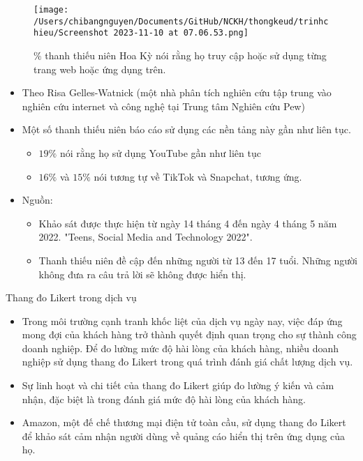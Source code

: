 \documentclass{beamer}
\begin{document}
\begin{frame}
\begin{figure}
    \centering
    \texttt{[image: /Users/chibangnguyen/Documents/GitHub/NCKH/thongkeud/trinhchieu/Screenshot 2023-11-10 at 07.06.53.png]}
    \caption{\centering $\%$ thanh thiếu niên Hoa Kỳ nói rằng họ truy cập hoặc sử dụng từng trang web hoặc ứng dụng trên.}
\end{figure}    
\end{frame}

\begin{frame}
    \begin{itemize}
    \item Theo Risa Gelles-Watnick (một nhà phân tích nghiên cứu tập trung vào nghiên cứu internet và công nghệ tại Trung tâm Nghiên cứu Pew)
    \item Một số thanh thiếu niên báo cáo sử dụng các nền tảng này gần như liên tục.
    \begin{itemize}
    \item $19\%$ nói rằng họ sử dụng YouTube gần như liên tục
    \item $16\%$ và $15\%$ nói tương tự về TikTok và Snapchat, tương ứng.
    \end{itemize}
    \end{itemize}
    \begin{itemize}
        \item Nguồn:
        \begin{itemize}
        \item Khảo sát được thực hiện từ ngày 14 tháng 4 đến ngày 4 tháng 5 năm 2022.
        "Teens, Social Media and Technology 2022".
        \item Thanh thiếu niên đề cập đến những người từ 13 đến 17 tuổi. Những người không đưa ra câu trả lời sẽ không được hiển thị.
        \end{itemize}
        \end{itemize}        
\end{frame}

\begin{frame}{Thang đo Likert trong dịch vụ}
    \begin{itemize}
    \item Trong môi trường cạnh tranh khốc liệt của dịch vụ ngày nay, việc đáp ứng mong đợi của khách hàng trở thành quyết định quan trọng cho sự thành công doanh nghiệp. Để đo lường mức độ hài lòng của khách hàng, nhiều doanh nghiệp sử dụng thang đo Likert trong quá trình đánh giá chất lượng dịch vụ.
    \item Sự linh hoạt và chi tiết của thang đo Likert giúp đo lường ý kiến và cảm nhận, đặc biệt là trong đánh giá mức độ hài lòng của khách hàng. 
    \item Amazon, một đế chế thương mại điện tử toàn cầu, sử dụng thang đo Likert để khảo sát cảm nhận người dùng về quảng cáo hiển thị trên ứng dụng của họ.
    \end{itemize}
\end{frame}
\end{document}
